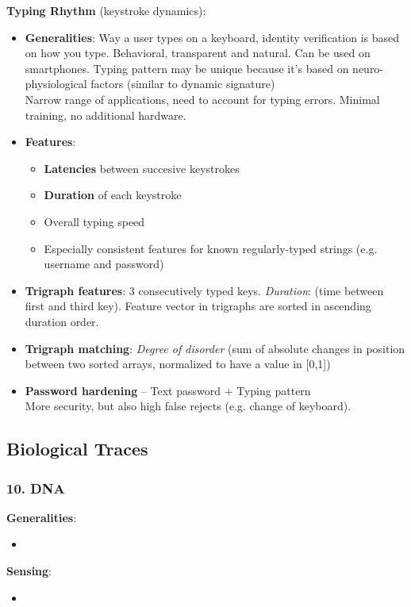 \documentclass[a4paper]{article}
\begin{document}
      \textbf{Typing Rhythm} (keystroke dynamics):
      \begin{itemize}
        \item \textbf{Generalities}: Way a user types on a keyboard, identity verification is based on how you type. Behavioral, transparent and natural. Can be used on smartphones. Typing pattern may be unique because it's based on neuro-physiological factors (similar to dynamic signature)\\
        Narrow range of applications, need to account for typing errors. Minimal training, no additional hardware.
        \item \textbf{Features}:
        \begin{itemize}
          \item \textbf{Latencies} between succesive keystrokes
          \item \textbf{Duration} of each keystroke
          \item Overall typing speed
          \item Especially consistent features for known regularly-typed strings (e.g. username and password)
        \end{itemize}
        \item \textbf{Trigraph features}: 3 consecutively typed keys. \emph{Duration}: (time between first and third key). Feature vector in trigraphs are sorted in ascending duration order.
        \item \textbf{Trigraph matching}: \emph{Degree of disorder} (sum of absolute changes in position between two sorted arrays, normalized to have a value in [0,1])
        \item\textbf{Password hardening} -- Text password + Typing pattern\\
        More security, but also high false rejects (e.g. change of keyboard).
      \end{itemize}
  \subsection*{Biological Traces}
    \subsubsection*{10. DNA}
      \textbf{Generalities}:
      \begin{itemize}
        \item 
      \end{itemize}

      \textbf{Sensing}:
      \begin{itemize}
        \item 
      \end{itemize}
\end{document}
